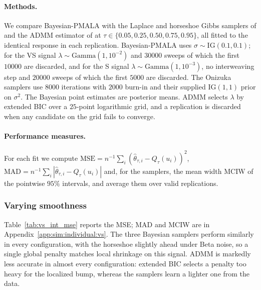 \paragraph{Methods.} We compare Bayesian-PMALA with the Laplace and horseshoe Gibbs samplers of \citet{onizuka2024fast} and the ADMM estimator of \citet{brantley2020baseline} at $\tau\in\{0.05,0.25,0.50,0.75,0.95\}$, all fitted to the identical response in each replication. Bayesian-PMALA uses $\sigma\sim\mathrm{IG}(0.1,0.1)$; for the VS signal $\lambda\sim\mathrm{Gamma}(1,10^{-2})$ and $30000$ sweeps of which the first $10000$ are discarded, and for the S signal $\lambda\sim\mathrm{Gamma}(1,10^{-3})$, no interweaving step and $20000$ sweeps of which the first $5000$ are discarded. The Onizuka samplers use $8000$ iterations with $2000$ burn-in and their supplied $\mathrm{IG}(1,1)$ prior on $\sigma^2$. The Bayesian point estimates are posterior means. ADMM selects $\lambda$ by extended BIC over a $25$-point logarithmic grid, and a replication is discarded when any candidate on the grid fails to converge.

\paragraph{Performance measures.} For each fit we compute $\mathrm{MSE}=n^{-1}\sum_i(\widehat\theta_{\tau,i}-Q_\tau(u_i))^2$, $\mathrm{MAD}=n^{-1}\sum_i|\widehat\theta_{\tau,i}-Q_\tau(u_i)|$ and, for the samplers, the mean width MCIW of the pointwise $95\%$ intervals, and average them over valid replications.

\subsubsection{Varying smoothness}
\label{sec:sim:ind:vs}

Table~\ref{tab:vs_int_mse} reports the MSE; MAD and MCIW are in Appendix~\ref{app:sim:individual:vs}. The three Bayesian samplers perform similarly in every configuration, with the horseshoe slightly ahead under Beta noise, so a single global penalty matches local shrinkage on this signal. ADMM is markedly less accurate in almost every configuration: extended BIC selects a penalty too heavy for the localized bump, whereas the samplers learn a lighter one from the data.

